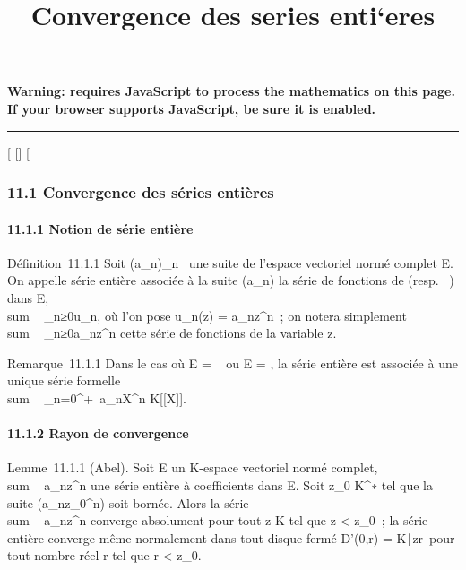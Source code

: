 \documentclass[]{article}
\title{Convergence des series enti`eres}
\author{}
\date{}
\begin{document}
\maketitle

\textbf{Warning: 
requires JavaScript to process the mathematics on this page.\\ If your
browser supports JavaScript, be sure it is enabled.}

\begin{center}\rule{3in}{0.4pt}\end{center}

[
[]
[

\subsubsection{11.1 Convergence des séries entières}

\paragraph{11.1.1 Notion de série entière}

Définition~11.1.1 Soit (a_n)_n\in{}~ une suite de l'espace
vectoriel normé complet E. On appelle série entière associée à la suite
(a_n) la série de fonctions de  (resp. ~) dans E,
\\sum ~
_n≥0u_n, où l'on pose u_n(z) =
a_nz^n~; on notera simplement
\\sum ~
_n≥0a_nz^n cette série de fonctions de la
variable z.

Remarque~11.1.1 Dans le cas où E = ~ ou E = , la série entière est
associée à une unique série formelle
\\sum ~
_n=0^+\infty~a_nX^n \in K[[X]].

\paragraph{11.1.2 Rayon de convergence}

Lemme~11.1.1 (Abel). Soit E un K-espace vectoriel normé complet,
\\sum ~
a_nz^n une série entière à coefficients dans E. Soit
z_0 \in K^∗ tel que la suite
(a_nz_0^n) soit bornée. Alors la série
\\sum ~
a_nz^n converge absolument pour tout z \in K tel que
z < z_0~; la
série entière converge même normalement dans tout disque fermé D'(0,r) =
\z \in
K∣z\leq r\
pour tout nombre réel r tel que r <
z_0.
\end{document}
